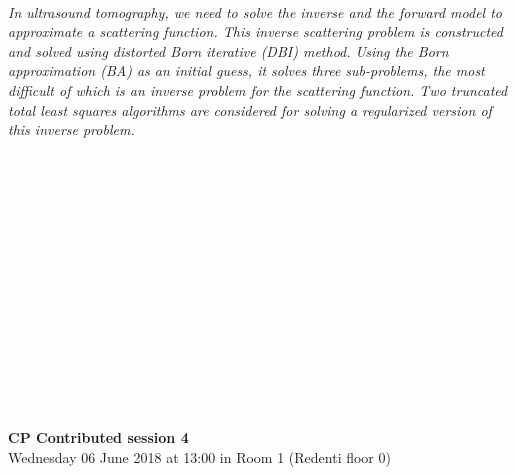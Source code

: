 \begin{multicols}{2}
\\
    \textit{In ultrasound tomography, we need to solve the inverse and the forward model to approximate a scattering function. This inverse scattering problem is constructed and solved using distorted Born iterative (DBI) method.  Using the Born approximation (BA) as an initial guess, it solves three sub-problems, the most difficult of which is an inverse problem for the scattering function.  Two truncated total least squares algorithms are considered for solving a regularized version of this inverse problem.}\\
\\ 
      \\
      \\\\
      \\
      \\\\
      \\
      \\\\
      \\
      \\\\
\\
  \end{multicols}
  \noindent\textbf{CP Contributed session 4}\\
    Wednesday 06 June 2018 at 13:00 in Room 1 (Redenti floor 0)  \\
  \textit{} \\
    
